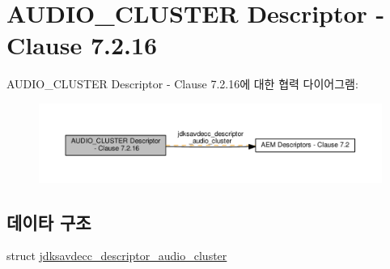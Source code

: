 \hypertarget{group__descriptor__audio__cluster}{}\section{A\+U\+D\+I\+O\+\_\+\+C\+L\+U\+S\+T\+ER Descriptor -\/ Clause 7.2.16}
\label{group__descriptor__audio__cluster}
A\+U\+D\+I\+O\+\_\+\+C\+L\+U\+S\+T\+ER Descriptor -\/ Clause 7.2.16에 대한 협력 다이어그램\+:
\nopagebreak
\begin{figure}[H]
\begin{center}
\leavevmode
\includegraphics[width=350pt]{group__descriptor__audio__cluster}
\end{center}
\end{figure}
\subsection*{데이타 구조}
\begin{DoxyCompactItemize}
\item 
struct \hyperlink{structjdksavdecc__descriptor__audio__cluster}{jdksavdecc\+\_\+descriptor\+\_\+audio\+\_\+cluster}
\end{DoxyCompactItemize}
